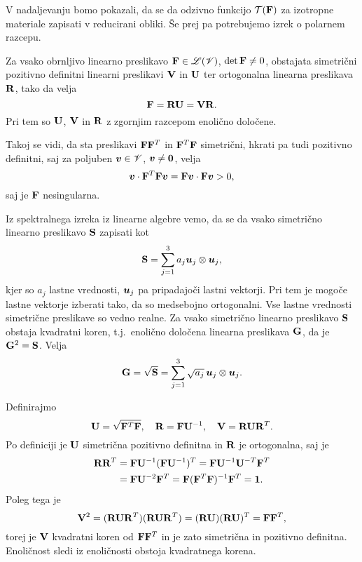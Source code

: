 V nadaljevanju bomo pokazali, da se da odzivno funkcijo $\mathcal{T}(\mathbf F)$ za izotropne materiale
zapisati v reducirani obliki. Še prej pa potrebujemo izrek o polarnem razcepu.

\begin{izrek}
	Za vsako obrnljivo linearno preslikavo $\mathbf F\in\mathscr L(\mathscr V)$, $\det\mathbf F\neq 0$,
	obstajata simetrični pozitivno definitni linearni preslikavi $\mathbf V$ in $\mathbf U$
	ter ortogonalna linearna preslikava $\mathbf R$, tako da velja
	\[
		\mathbf F=\mathbf R\mathbf U=\mathbf V\mathbf R.
	\]
	Pri tem so $\mathbf U$, $\mathbf V$ in $\mathbf R$ z zgornjim razcepom enolično določene.
\end{izrek}

\proof
	Takoj se vidi, da sta preslikavi $\mathbf F\mathbf F^T$ in $\mathbf F^T\mathbf F$
	simetrični, hkrati pa tudi pozitivno definitni, saj za poljuben $\boldsymbol v\in\mathscr V$,
	$\boldsymbol v\neq\boldsymbol 0$, velja
	\[ \boldsymbol v\cdot\mathbf F^T\mathbf F\boldsymbol v=\mathbf F\boldsymbol v\cdot\mathbf F\boldsymbol v>0, \]
	saj je $\mathbf F$ nesingularna.
	
	Iz spektralnega izreka iz linearne algebre vemo, da se da vsako simetrično
	linearno preslikavo $\mathbf S$ zapisati kot
	\[ \mathbf S=\sum_{j=1}^3 a_j\boldsymbol u_j\otimes\boldsymbol u_j, \]
	kjer so $a_j$ lastne vrednosti, $\boldsymbol u_j$ pa pripadajoči lastni vektorji.
	Pri tem je mogoče lastne vektorje izberati tako, da so medsebojno ortogonalni.
	Vse lastne vrednosti simetrične preslikave so vedno realne. Za vsako
	simetrično linearno preslikavo $\mathbf S$ obstaja kvadratni koren, t.j.~enolično določena linearna
	preslikava $\mathbf G$, da je $\mathbf G^2=\mathbf S$. Velja
	\[ \mathbf G=\sqrt{\mathbf S}=\sum_{j=1}^3 \sqrt{a_j}\,\boldsymbol u_j\otimes\boldsymbol u_j. \]
	
	Definirajmo
	\begin{equation} \label{e:uandv}
		\mathbf U=\sqrt{\mathbf F^T\mathbf F},\quad\mathbf R=\mathbf F\mathbf U^{-1},\quad
		\mathbf V=\mathbf R\mathbf U\mathbf R^T.
	\end{equation}
	Po definiciji je $\mathbf U$ simetrična pozitivno definitna in $\mathbf R$ je ortogonalna, saj je
	\begin{align*}
		\mathbf R\mathbf R^T&=\mathbf F\mathbf U^{-1}(\mathbf F\mathbf U^{-1})^T
		=\mathbf F\mathbf U^{-1}\mathbf U^{-T}\mathbf F^T \\ &=\mathbf F\mathbf U^{-2}\mathbf F^T
		=\mathbf F(\mathbf F^T\mathbf F)^{-1}\mathbf F^T=\mathbf 1.
	\end{align*}
	Poleg tega je
	\[
		\mathbf V^2=(\mathbf R\mathbf U\mathbf R^T)(\mathbf R\mathbf U\mathbf R^T)
		=(\mathbf R\mathbf U)(\mathbf R\mathbf U)^T=\mathbf F\mathbf F^T,
	\]
	torej je $\mathbf V$ kvadratni koren od $\mathbf F\mathbf F^T$ in je zato
	simetrična in pozitivno definitna. Enoličnost sledi iz enoličnosti obstoja
	kvadratnega korena.
\endproof

